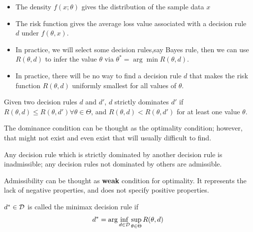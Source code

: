 \begin{refsection}
\begin{remark}\hfill
\begin{itemize}
    \item The density $f(x;\theta)$ gives the distribution of the sample data $x$
    \item The risk function gives the average loss value associated with a decision rule $d$ under $f(\theta,x)$.
    \item In practice, we will select some decision rules,say Bayes rule, then we can use $R(\theta,d)$ to infer the value $\theta$ via $\theta^* = \arg \min R(\theta,d)$.
    \item In practice, there will be no way to find a decision rule $d$ that makes the risk function $R(\theta,d)$ uniformly smallest for all values of $\theta$.
\end{itemize}
\end{remark}

\begin{definition}
\cite[7]{young2005essentials}
Given two decision rules $d$ and $d'$, $d$ strictly dominates $d'$ if $R(\theta,d)\leq R(\theta,d') \forall \theta\in \Theta$, and $R(\theta,d) < R(\theta,d')$ for at least one value $\theta$. 
\end{definition}

\begin{remark}
The dominance condition can be thought as the optimality condition; however, that might not exist and even exist that will usually difficult to find.   
\end{remark}

\begin{definition}
\cite[7]{young2005essentials} Any decision rule which is strictly dominated by another decision rule is inadmissible; any decision rules not dominated by others are admissible. 
\end{definition}

\begin{remark}
Admissibility can be thought as \textbf{weak} condition for optimality. It represents the lack of negative properties, and does not specify positive properties.
\end{remark}

\begin{definition}
\cite[8]{young2005essentials}
$d^*\in \mathcal{D}$ is called the minimax decision rule if
$$d^* = \arg \inf_{d\in \mathcal{D}} \sup_{\theta \in \Theta} R(\theta,d)$$
\end{definition}


\end{refsection}
